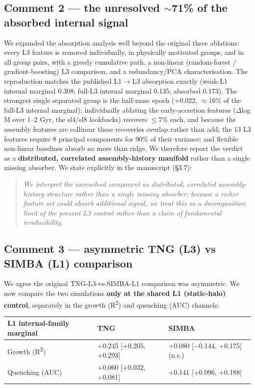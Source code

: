 \documentclass[11pt]{article}
\begin{document}
\subsection*{Comment 2 --- the unresolved $\sim$71\% of the absorbed internal signal}
We expanded the absorption analysis well beyond the original three ablations: every L3 feature is removed individually, in physically motivated groups, and in all group pairs, with a greedy cumulative path, a non-linear (random-forest / gradient-boosting) L3 comparison, and a redundancy/PCA characterisation. The reproduction matches the published L1$\rightarrow$L3 absorption exactly (weak-L1 internal marginal 0.308; full-L3 internal marginal 0.135; absorbed 0.173). The strongest single separated group is the half-mass epoch (+0.022, $\approx$16\% of the full-L3 internal marginal); individually ablating the early-accretion features ($\Delta$log M over 1--2 Gyr, the sl4/sl8 lookbacks) recovers $\leq$7\% each, and because the assembly features are collinear these recoveries overlap rather than add; the 13 L3 features require 8 principal components for 90\% of their variance; and flexible non-linear baselines absorb no more than ridge. We therefore report the verdict as a \textbf{distributed, correlated assembly-history manifold} rather than a single missing absorber. We state explicitly in the manuscript (\S{}3.7):

\begin{quote}\itshape
We interpret the unresolved component as distributed, correlated assembly-history structure rather than a single missing absorber; because a richer feature set could absorb additional signal, we treat this as a decomposition limit of the present L3 control rather than a claim of fundamental irreducibility.
\end{quote}

\subsection*{Comment 3 --- asymmetric TNG (L3) vs SIMBA (L1) comparison}
We agree the original TNG-L3-vs-SIMBA-L1 comparison was asymmetric. We now compare the two simulations \textbf{only at the shared L1 (static-halo) control}, separately in the growth (R\textsuperscript{2}) and quenching (AUC) channels:

\begin{center}\small
\begin{tabular}{lll}
\hline
L1 internal-family marginal & TNG & SIMBA \\
\hline
Growth (R\textsuperscript{2}) & +0.245 [+0.205, +0.293] & +0.080 [$-$0.144, +0.175] (n.s.) \\
Quenching (AUC) & +0.060 [+0.032, +0.081] & +0.141 [+0.096, +0.188] \\
\hline
\end{tabular}\end{center}
\end{document}
